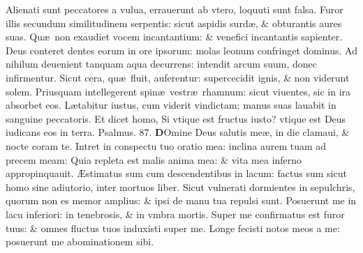 \documentclass[a5paper,10pt]{book}
\def\ae{æ}
\def\AE{Æ}
\begin{document}
\begin{multicols*}{2}
\newline \color{red} A\color{black}lienati sunt peccatores a vulua, errauerunt ab vtero, loquuti sunt falsa.
\newline \color{red} F\color{black}uror illis secundum similitudinem serpentis: sicut aspidis surd\ae , \& obturantis aures suas.
\newline \color{red} Q\color{black}u\ae \ non exaudiet vocem incantantium: \& venefici incantantis sapienter.
\newline \color{red} D\color{black}eus conteret dentes eorum in ore ipsorum: molas leonum confringet dominus.
\newline \color{red} A\color{black}d nihilum deuenient tanquam aqua decurrens: intendit arcum suum, donec infirmentur.
\newline \color{red} S\color{black}icut cera, qu\ae \ fluit, auferentur: supercecidit ignis, \& non viderunt solem.
\newline \color{red} P\color{black}riusquam intellegerent spin\ae \ vestr\ae \ rhamnum: sicut viuentes, sic in ira absorbet eos.
\newline \color{red} L\color{black}\ae tabitur iustus, cum viderit vindictam: manus suas lauabit in sanguine peccatoris.
\newline \color{red} E\color{black}t dicet homo, Si vtique est fructus iusto? vtique est Deus iudicans eos in terra. \quad \color{red} Psalmus. 87. \color{black}
\vspace{-.25em}
\lettrine[lines=2]{\bfseries \color{red} D}{}Omine Deus salutis me\ae , in die clamaui, \& nocte coram te.
\newline \color{red} I\color{black}ntret in conspectu tuo oratio mea: inclina aurem tuam ad precem meam:
\newline \color{red} Q\color{black}uia repleta est malis anima mea: \& vita mea inferno appropinquauit.
\newline \color{red} \AE\color{black}stimatus sum cum descendentibus in lacum: factus sum sicut homo sine adiutorio, inter mortuos liber.
\newline \color{red} S\color{black}icut vulnerati dormientes in sepulchris, quorum non es memor amplius: \& ipsi de manu tua repulsi sunt.
\newline \color{red} P\color{black}osuerunt me in lacu inferiori: in tenebrosis, \& in vmbra mortis.
\newline \color{red} S\color{black}uper me confirmatus est furor tuus: \& omnes fluctus tuos induxisti super me.
\newline \color{red} L\color{black}onge fecisti notos meos a me: posuerunt me abominationem sibi.

\end{multicols*}
\end{document}
